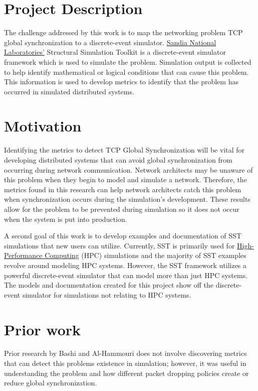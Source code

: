 \documentclass{article}
\begin{document}
\section{Project Description} %

The challenge addressed by this work is to map the networking problem TCP global synchronization to a discrete-event simulator. \href{https://www.sandia.gov/}{Sandia National Laboratories'} Structural Simulation Toolkit is a discrete-event simulator framework which is used to simulate the problem. Simulation output is collected to help identify mathematical or logical conditions that can cause this problem. This information is used to develop metrics to identify that the problem has occurred in simulated distributed systems. 

\section{Motivation} %

Identifying the metrics to detect TCP Global Synchronization will be vital for developing distributed systems that can avoid global synchronization from occurring during network communication. Network architects may be unaware of this problem when they begin to model and simulate a network. Therefore, the metrics found in this research can help network architects catch this problem when synchronization occurs during the simulation's development. These results allow for the problem to be prevented during simulation so it does not occur when the system is put into production.

A second goal of this work is to develop examples and documentation of SST simulations that new users can utilize. Currently, SST is primarily used for \href{https://en.wikipedia.org/wiki/High-performance_computing}{High-Performance Computing} (HPC) simulations and the majority of SST examples revolve around modeling HPC systems. However, the SST framework utilizes a powerful discrete-event simulator that can model more than just HPC systems. The models and documentation created for this project show off the discrete-event simulator for simulations not relating to HPC systems.

\section{Prior work} %
Prior research by Bashi and Al-Hammouri \cite{Bashi2017} does not involve discovering metrics that can detect this problems existence in simulation; however, it was useful in understanding the problem and how different packet dropping policies create or reduce global synchronization.
\end{document}
